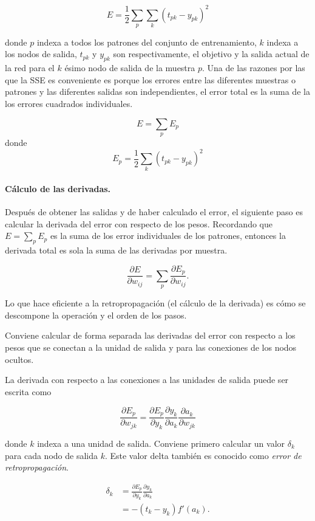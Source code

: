 \[
E = \frac{1}{2} \sum_p\sum_k(t_{pk} - y_{pk})^2
\]

donde $p$ indexa a todos los patrones del conjunto de entrenamiento, $k$ indexa a
los nodos de salida, $t_{pk}$ y $y_{pk}$ son respectivamente, el objetivo y la salida actual de la red para el
$k$ ésimo nodo de salida de la muestra $p$.
Una de las razones por las que la SSE es conveniente es porque los errores entre las diferentes
muestras o patrones y las diferentes salidas son independientes, el error
total es la suma de la los errores cuadrados individuales.

\[
E = \sum_p E_p
\]
donde 
\[
E_p = \frac{1}{2} \sum_k (t_{pk} - y_{pk})^2
\]

\paragraph{Cálculo de las derivadas.}

Después de obtener las salidas y de haber calculado el error, el siguiente paso es
calcular la derivada del error con respecto de los pesos. Recordando que $E = \sum_p E_p$
es la suma de los error individuales de los patrones, entonces la derivada total
es sola la suma de las derivadas por muestra.

\[
\frac{\partial E}{\partial w_{ij}} = \sum_p \frac{\partial E_p}{\partial w_{ij}}.    
\]


Lo que hace eficiente a la retropropagación (el cálculo de la derivada) es cómo se descompone la operación 
y el orden de los pasos. 

Conviene calcular de forma separada las derivadas del error
con respecto a los pesos que se conectan a la unidad de salida
y para las conexiones de los nodos ocultos.

La derivada con respecto a las conexiones a las unidades de salida puede ser escrita como

\begin{equation}\label{eq:derivative-output}
    \frac{\partial E_p}{\partial w_{jk}} = \frac{\partial E_p}{\partial y_k}\frac{\partial y_k}{\partial a_k} \frac{\partial a_{k}}{\partial w_{jk}}
\end{equation}

donde $k$ indexa a una unidad de salida. Conviene primero calcular un valor
$\delta_k$ para cada nodo de salida $k$. Este valor delta también es conocido
como \textit{error de retropropagación}.

\begin{align*}
\delta_k &= \frac{\partial E_p}{\partial y_k}\frac{\partial y_k}{\partial a_k} \\
&= -(t_k - y_k) f'(a_k).
\end{align*}

